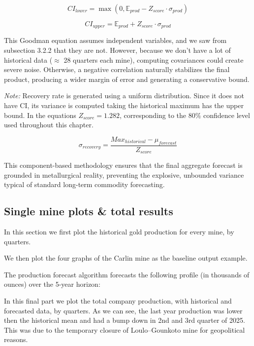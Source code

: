 \begin{equation}
    CI_{lower} = \max(0, \mathbb{E}_{prod} - Z_{score} \cdot \sigma_{prod})
\end{equation}

\begin{equation}
CI_{upper} = \mathbb{E}_{prod} + Z_{score} \cdot \sigma_{prod}
\end{equation}

This Goodman equation assumes independent variables, and we saw from subsection 3.2.2 that they are not. However, because we don't have a lot of historical data ($\approx$ 28 quarters each mine), computing covariances could create severe noise. Otherwise, a negative correlation naturally stabilizes the final product, producing a wider margin of error and generating a conservative bound.

\textit{Note:} Recovery rate is generated using a uniform distribution. Since it does not have CI, its variance is computed taking the historical maximum has the upper bound. In the equations $Z_{score} = 1.282$, corresponding to the $80\%$ confidence level used throughout this chapter.

\begin{equation}
    \sigma_{recovery}=\frac{Max_{historical}-\mu_{forecast}}{Z_{score}}
\end{equation}

This component-based methodology ensures that the final aggregate forecast is grounded in metallurgical reality, preventing the explosive, unbounded variance typical of standard long-term commodity forecasting.
\subsection{Single mine plots \& total results}
In this section we first plot the historical gold production for every mine, by quarters.



We then plot the four graphs of the Carlin mine as the baseline output example.



The production forecast algorithm forecasts the following profile (in thousands of ounces) over the 5-year horizon:



In this final part we plot the total company production, with historical and forecasted data, by quarters. As we can see, the last year production was lower then the historical mean and had a bump down in 2nd and 3rd quarter of 2025. This was due to the temporary closure of Loulo--Gounkoto mine for geopolitical reasons. 

